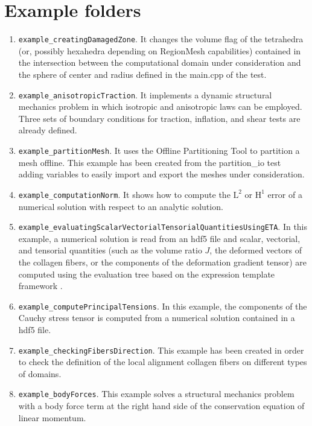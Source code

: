 \documentclass[a4paper, 10pt,twoside]{article}
\theoremstyle{plain}
\theoremstyle{definition}
\theoremstyle{remark}
\begin{document}
\section{Example folders}
\begin{enumerate}
\item \texttt{example\_creatingDamagedZone}. It changes the volume flag of the tetrahedra (or, possibly hexahedra depending on RegionMesh capabilities) contained in the intersection between the computational domain under consideration and the sphere of center and radius defined in the main.cpp of the test.
\item \texttt{example\_anisotropicTraction}. It implements a dynamic structural mechanics problem in which isotropic and anisotropic laws can be employed. Three sets of boundary conditions for traction, inflation, and shear tests are already defined.
\item \texttt{example\_partitionMesh}. It uses the Offline Partitioning Tool to partition a mesh offline. This example has been created from the partition\_io test adding variables to easily import and export the meshes under consideration.
\item \texttt{example\_computationNorm}. It shows how to compute the $\text{L}^2$ or $\text{H}^1$ error of a numerical solution with respect to an analytic solution.
\item \texttt{example\_evaluatingScalarVectorialTensorialQuantitiesUsingETA}. In this example, a numerical solution is read from an hdf5 file and scalar, vectorial, and tensorial quantities (such as the volume ratio $J$, the deformed vectors of the collagen fibers, or the components of the deformation gradient tensor) are computed using the evaluation tree based on the expression template framework \cite{thesis::Quinodoz}.
\item \texttt{example\_computePrincipalTensions}. In this example, the components of the Cauchy stress tensor is computed from a numerical solution contained in a hdf5 file.
\item \texttt{example\_checkingFibersDirection}. This example has been created in order to check the definition of the local alignment collagen fibers on different types of domains.
\item \texttt{example\_bodyForces}. This example solves a structural mechanics problem with a body force term at the right hand side of the conservation equation of linear momentum.
\end{enumerate}

\end{document}
